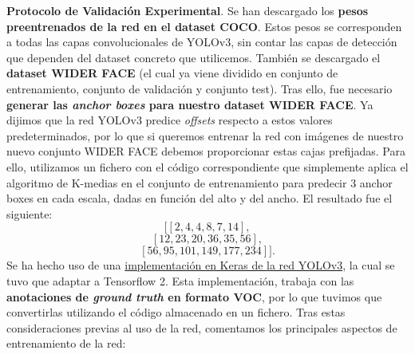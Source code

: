 \documentclass[10pt,twocolumn,letterpaper]{article}
\begin{document}
\textbf{Protocolo de Validación Experimental}. Se han descargado los \textbf{pesos preentrenados de la red en el dataset COCO}. Estos pesos se corresponden a todas las capas convolucionales de YOLOv3, sin contar las capas de detección que dependen del dataset concreto que utilicemos. También se
descargado el \textbf{dataset WIDER FACE} (el cual ya viene dividido en conjunto de entrenamiento, conjunto de validación y conjunto test). Tras ello, fue necesario \textbf{generar las \textit{anchor boxes} para nuestro dataset WIDER FACE}. Ya dijimos que la red YOLOv3 predice \textit{offsets} respecto a estos valores predeterminados, por lo que si queremos entrenar la red con imágenes de nuestro nuevo conjunto WIDER FACE debemos proporcionar estas cajas prefijadas. Para ello, utilizamos un fichero con el código correspondiente que simplemente aplica el algoritmo de K-medias en el conjunto de entrenamiento para predecir 3 anchor boxes en cada escala, dadas en función del alto y del ancho. El resultado fue el siguiente:
$$[[2,4,4,8,7,14],$$
$$[12,23,20,36,35,56],$$
$$[56,95,101,149,177,234]].$$
Se ha hecho uso de una \href{https://github.com/experiencor/keras-yolo3}{implementación en Keras de la red YOLOv3}, la cual se tuvo que adaptar a Tensorflow 2. Esta implementación, trabaja con las \textbf{anotaciones de \textit{ground truth} en formato VOC}, por lo que tuvimos que convertirlas utilizando el código almacenado en un fichero.
Tras estas consideraciones previas al uso de la red, comentamos los principales aspectos de entrenamiento de la red:
\end{document}
